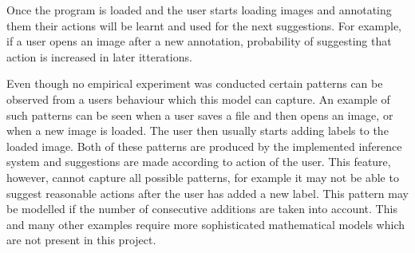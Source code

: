Once the program is loaded and the user starts loading images and annotating them their actions will be learnt and used for the next suggestions. For example, if a user opens an image after a new annotation, probability of suggesting that action is increased in later itterations.



Even though no empirical experiment was conducted certain patterns can be observed from a users behaviour which this model can capture. An example of such patterns can be seen when a user saves a file and then opens an image, or when a new image is loaded.  The user then usually starts adding labels to the loaded image. Both of these patterns are produced by the implemented inference system and suggestions are made according to action of the user.
This feature, however, cannot capture all possible patterns, for example it may not be able to suggest reasonable actions after the user has added a new label. This pattern may be modelled if the number of consecutive additions are taken into account. This and many other examples require more sophisticated mathematical models which are not present in this project.
